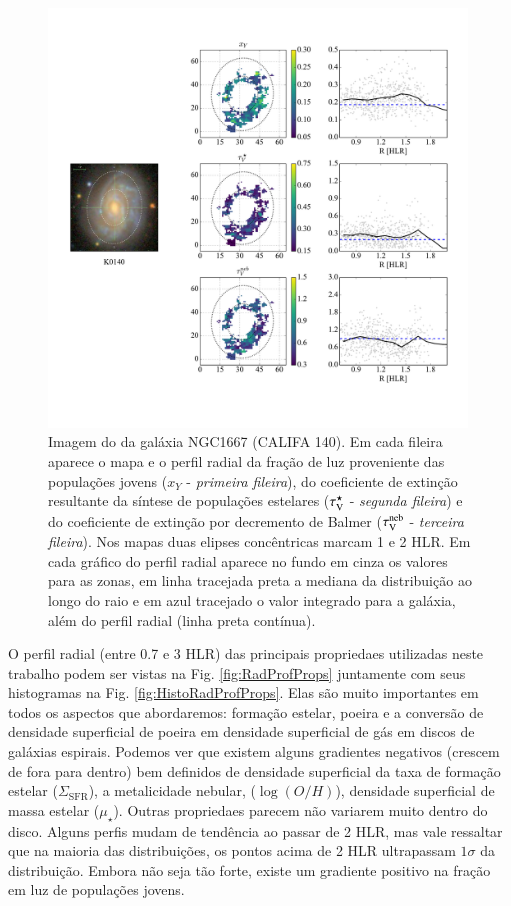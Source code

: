\begin{figure}
	\centering
	\includegraphics[width=0.99\textwidth]{figuras/K0140_xY_radialProfile_realsample.pdf}
	\caption[Imagem e exemplos de mapas e perfis radiais.]
	{Imagem do \SDSS da galáxia NGC1667 (CALIFA 140). Em cada fileira aparece o mapa e o perfil radial
da fração de luz proveniente das populações jovens ($x_Y$ - \emph{primeira fileira}), do
coeficiente de extinção resultante da síntese de populações estelares ($\tau_{\mathrm{V}}^\star$ - \emph{segunda
fileira}) e do coeficiente de extinção por decremento de Balmer ($\tau_{\mathrm{V}}^{\mathrm{neb}}$ - \emph{terceira
fileira}). Nos mapas duas elipses concêntricas marcam 1 e 2 HLR. Em cada gráfico do perfil radial
aparece no fundo em cinza os valores para as zonas, em linha tracejada preta a mediana da
distribuição ao longo do raio e em azul tracejado o valor integrado para a galáxia, além do perfil
radial (linha preta contínua).}
	\label{fig:K0140xYRadProf}
\end{figure}

O perfil radial (entre 0.7 e 3 HLR) das principais propriedaes utilizadas neste trabalho podem ser
vistas na Fig. \ref{fig:RadProfProps} juntamente com seus histogramas na Fig.
\ref{fig:HistoRadProfProps}. Elas são muito importantes em todos os aspectos que abordaremos:
formação estelar, poeira e a conversão de densidade superficial de poeira em densidade superficial
de gás em discos de galáxias espirais. Podemos ver que existem alguns gradientes negativos (crescem
de fora para dentro) bem definidos de densidade superficial da taxa de formação estelar
($\Sigma_{\mathrm{SFR}}$), a metalicidade nebular, ($\log (O/H)$), densidade superficial de massa
estelar ($\mu_\star$). Outras propriedaes parecem não variarem muito dentro do disco. Alguns perfis
mudam de tendência ao passar de 2 HLR, mas vale ressaltar que na maioria das distribuições, os
pontos acima de 2 HLR ultrapassam $1\sigma$ da distribuição. Embora não seja tão forte, existe um
gradiente positivo na fração em luz de populações jovens.

